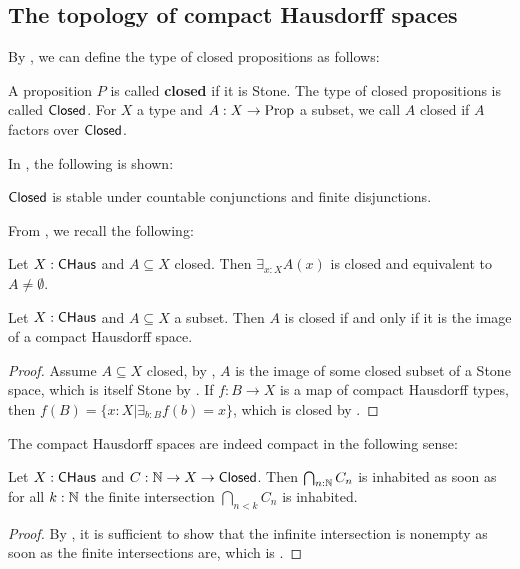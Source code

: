 
\subsection{The topology of compact Hausdorff spaces}
By \parencite[Cor 3.9]{synthetic-stone-duality}, we can define the type of closed propositions as follows:
\begin{definition}\label{dfnClosedOpen}
  A proposition $P$ is called \textbf{closed} if it is Stone. 
  The type of closed propositions is called $\mathsf{Closed}$.
  For $X$ a type and $A:X \to \mathrm{Prop}$ a subset, we call $A$ closed if $A$ factors over $\mathsf{Closed}$.
\end{definition}

In \parencite[Lemma 1.21]{synthetic-stone-duality}, the following is shown:
\begin{remark}\label{ClosureClosedOpen}
  $\mathsf{Closed}$ is stable under countable conjunctions and finite disjunctions. %
\end{remark}

From \parencite[Cor 4.9]{synthetic-stone-duality}, we recall the following:
\begin{lemma}\label{ExistsClosedSubsetDoubleNegation}
  Let $X:\mathsf{CHaus}$ and $A\subseteq X$ closed. Then $\exists_{x:X}A(x)$ is closed and equivalent to $A\neq \emptyset$. 
\end{lemma}

\begin{lemma}\label{CHausClosedImage}
  Let $X:\mathsf{CHaus}$ and $A\subseteq X$ a subset. Then $A$ is closed if and only if it is the image of a compact Hausdorff space. 
\end{lemma}
\begin{proof}
  Assume $A\subseteq X$ closed, by \parencite[Lemma 4.2]{synthetic-stone-duality}, $A$ is the image of some closed subset of a Stone space, which is itself Stone by \parencite[Cor 3.12]{synthetic-stone-duality}. If $f:B \to X$ is a map of compact Hausdorff types, then $f(B) = \{ x : X | \exists_{b:B} f(b) = x\}$, which is closed by .
\end{proof}
The compact Hausdorff spaces are indeed compact in the following sense:
\begin{lemma}\label{compactnessCHaus}
  Let $X:\mathsf{CHaus}$ and $C:\mathbb{N} \to X \to \mathsf{Closed}$. Then $\bigcap_{n:\mathbb{N}} C_n$ is inhabited as soon as for all $k:\mathbb{N}$ the finite intersection $\bigcap_{n<k} C_n$ is inhabited. 
\end{lemma}
\begin{proof}
  By , it is sufficient to show that the infinite intersection is nonempty as soon as the finite intersections are, which is \parencite[Lemma 4.5]{synthetic-stone-duality}.
\end{proof}

